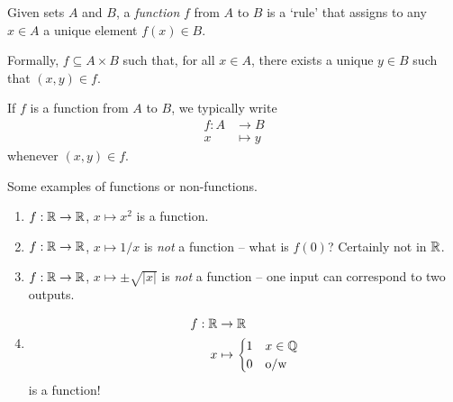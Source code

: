 \documentclass{../template/note}
\begin{document}
    \begin{definition}
        Given sets \(A\) and \(B\), a \emph{function} \(f\) from \(A\) to \(B\) is a `rule' that assigns to any \(x \in A\) a unique element \(f(x) \in B\).
        
        Formally, \(f \subseteq A \times B\) such that, for all \(x \in A\), there exists a unique \(y \in B\) such that \((x, y) \in f\).

        If \(f\) is a function from \(A\) to \(B\), we typically write
        \begin{align*}
            f: A &\to B \\
            x &\mapsto y
        \end{align*}
        whenever \((x, y) \in f\).
        
    \end{definition}
    
    \begin{example}
        Some examples of functions or non-functions.
        \begin{enumerate}[label=\protect\circled{\arabic*}]
            \item \(f: \mathbb R \to \mathbb R\), \(x \mapsto x^2\) is a function.
            \item \(f: \mathbb R \to \mathbb R\), \(x \mapsto 1/x\) is \emph{not} a function -- what is \(f(0)\)? Certainly not in \(\mathbb R\).
            \item \(f: \mathbb R \to \mathbb R\), \(x \mapsto \pm \sqrt{|x|}\) is \emph{not} a function -- one input can correspond to two outputs.
            \item \begin{align*}
                f: \mathbb R &\to \mathbb R \\
                x &\mapsto \begin{cases}
                    1 & x \in \mathbb Q \\
                    0 & \text{o/w}
                \end{cases}
            \end{align*}
            is a function!
        \end{enumerate}
    \end{example}

    
\end{document}
